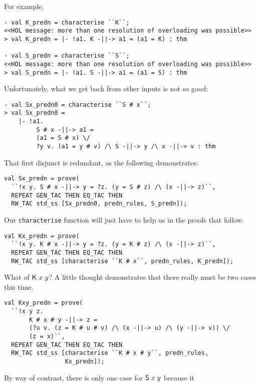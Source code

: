 For example,
\begin{session}\begin{verbatim}
- val K_predn = characterise ``K``;
<<HOL message: more than one resolution of overloading was possible>>
> val K_predn = |- !a1. K -||-> a1 = (a1 = K) : thm

- val S_predn = characterise ``S``;
<<HOL message: more than one resolution of overloading was possible>>
> val S_predn = |- !a1. S -||-> a1 = (a1 = S) : thm
\end{verbatim}\end{session}
Unfortunately, what we get back from other inputs is not so good:
\begin{session}\begin{verbatim}
- val Sx_predn0 = characterise ``S # x``;
> val Sx_predn0 =
    |- !a1.
         S # x -||-> a1 =
         (a1 = S # x) \/
         ?y v. (a1 = y # v) /\ S -||-> y /\ x -||-> v : thm
\end{verbatim}\end{session}
That first disjunct is redundant, as the following demonstrates:
\begin{session}\begin{verbatim}
val Sx_predn = prove(
  ``!x y. S # x -||-> y = ?z. (y = S # z) /\ (x -||-> z)``,
  REPEAT GEN_TAC THEN EQ_TAC THEN
  RW_TAC std_ss [Sx_predn0, predn_rules, S_predn]);
\end{verbatim}\end{session}
Our \texttt{characterise} function will just have to help us in the
proofs that follow.
\begin{session}\begin{verbatim}
val Kx_predn = prove(
  ``!x y. K # x -||-> y = ?z. (y = K # z) /\ (x -||-> z)``,
  REPEAT GEN_TAC THEN EQ_TAC THEN
  RW_TAC std_ss [characterise ``K # x``, predn_rules, K_predn]);
\end{verbatim}\end{session}
What of ${\sf K}\;x\;y$?  A little thought demonstrates that there really
must be two cases this time.
\begin{session}\begin{verbatim}
val Kxy_predn = prove(
  ``!x y z.
       K # x # y -||-> z =
       (?u v. (z = K # u # v) /\ (x -||-> u) /\ (y -||-> v)) \/
       (z = x)``,
  REPEAT GEN_TAC THEN EQ_TAC THEN
  RW_TAC std_ss [characterise ``K # x # y``, predn_rules,
                 Kx_predn]);
\end{verbatim}\end{session}
By way of contrast, there is only one case for ${\sf S}\;x\;y$ because it
